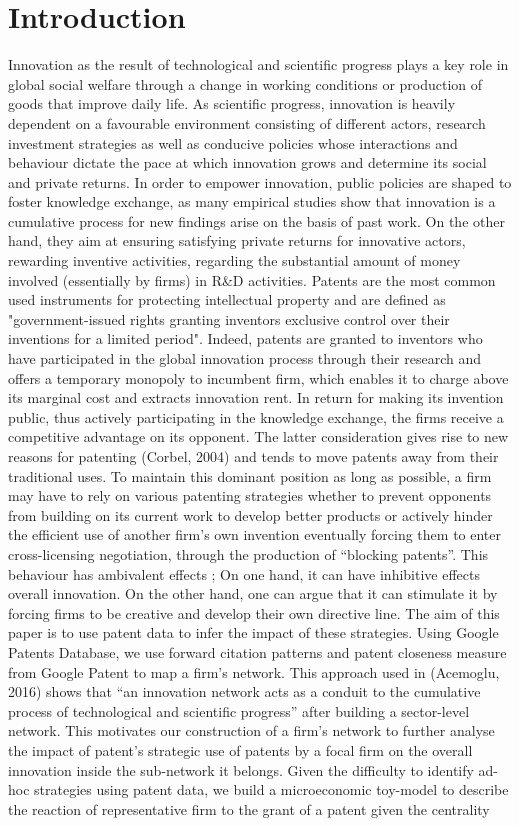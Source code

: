 \documentclass[12pt]{article}
\begin{document}
\section{Introduction}
Innovation as the result of technological and scientific progress plays a key role in global social welfare through a change in working conditions or production of goods that improve daily life. As scientific progress, innovation is heavily dependent on a favourable environment consisting of different actors, research investment strategies as well as conducive policies whose interactions and behaviour dictate the pace at which innovation grows and determine its social and private returns. In order to empower innovation, public policies are shaped to foster knowledge exchange, as many empirical studies show that innovation is a cumulative process for new findings arise on the basis of past work. On the other hand, they aim at ensuring satisfying private returns for innovative actors, rewarding inventive activities, regarding the substantial amount of money involved (essentially by firms) in R\&D activities. Patents are the most common used instruments for protecting intellectual property and are defined as "government-issued rights granting inventors exclusive control over their inventions for a limited period". Indeed, patents are granted to inventors who have participated in the global innovation process through their research and offers a temporary monopoly to incumbent firm, which enables it to charge above its marginal cost and extracts innovation rent. In return for making its invention public, thus actively participating in the knowledge exchange, the firms receive a competitive advantage on its opponent. The latter consideration gives rise to new reasons for patenting (Corbel, 2004) and tends to move patents away from their traditional uses. To maintain this dominant position as long as possible, a firm may have to rely on various patenting strategies whether to prevent opponents from building on its current work to develop better products or actively hinder the efficient use of another firm's own invention eventually forcing them to enter cross-licensing negotiation, through the production of “blocking patents”. This behaviour has ambivalent effects ; On one hand, it can have inhibitive effects overall innovation. On the other hand, one can argue that it can stimulate it by forcing firms to be creative and develop their own directive line. The aim of this paper is to use patent data to infer the impact of these strategies. Using Google Patents Database, we use forward citation patterns and patent closeness measure from Google Patent  to map a firm’s network. This approach used in (Acemoglu, 2016) shows that “an innovation network acts as a conduit to the cumulative process of technological and scientific progress” after building a sector-level network. This motivates our construction of a firm’s network to further analyse the impact of patent’s strategic use of patents by a focal firm on the overall innovation inside the sub-network it belongs. Given the difficulty to identify ad-hoc strategies using patent data, we build a microeconomic toy-model to describe the reaction of representative firm to the grant of a patent given the centrality 
\end{document}
